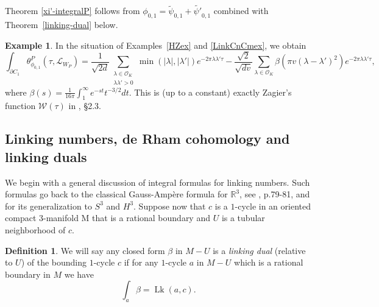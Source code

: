 \documentclass[12pt,leqno]{amsart}
\numberwithin{equation}{section}
\theoremstyle{plain}
\theoremstyle{definition}
\newtheorem{definition}[theorem]{Definition}
\newtheorem{example}[theorem]{Example}
\theoremstyle{remark}
\newcommand{\R}{\mathbb{R}}
\newcommand{\la}{\lambda}
\newcommand{\calL}{\mathcal{L}}
\newcommand{\Lk}{\operatorname{Lk}}
\begin{document}
Theorem \ref{xi'-integralP} follows from $\phi_{0,1} = \tilde{\psi}_{0,1} + \tilde{\psi'}_{0,1}$ combined with Theorem~\ref{linking-dual} below.  

\begin{example}\label{HZbeta}
In the situation of Examples~\ref{HZex} and \ref{LinkCnCmex}, we obtain
\[
\int_{\partial C_1} \theta^P_{\phi_{0,1}}(\tau,\calL_{W_P}) = \frac{1}{\sqrt{2d}} \sum_{\substack{\la \in \mathcal{O}_K \\ \la\la'>0}} \min(|\la|,|\la'|) e^{-2\pi \la \la' \tau } - \frac{\sqrt{2}}{\sqrt{dv}} \sum_{\la \in \mathcal{O}_K} \beta (\pi v (\la-\la')^2) e^{-2\pi \la \la' \tau},
\]
where $\beta(s) = \tfrac1{16\pi} \int_1^{\infty} e^{-st}t^{-3/2} dt$. This is (up to a constant) exactly Zagier's function $\mathcal{W}(\tau)$ in \cite{HZ}, \S 2.3. 


\end{example}

\subsection{Linking numbers, de Rham cohomology and linking duals} \label{generallinking}
We begin with a general discussion of integral formulas for linking numbers.
Such formulas go back to the classical Gauss-Amp\`ere formula for $\R^3$, see \cite{F}, p.79-81, and \cite{DG} for its generalization to $S^3$ and $H^3$. 
Suppose now that $c$ is a $1$-cycle in an oriented compact $3$-manifold M that is a rational boundary and $U$ is a tubular neighborhood of $c$. 
\begin{definition}
We will say any closed form $\beta$ in $M-U$ is a {\it linking dual} (relative to $U$) of the bounding $1$-cycle $c$ if for any $1$-cycle $a$ in $M-U$
which is a rational boundary in $M$ we have
\begin{equation*} \label{linkingdualdef} 
\int_a \beta = \Lk(a,c).
\end{equation*}
\end{definition}
\end{document}
